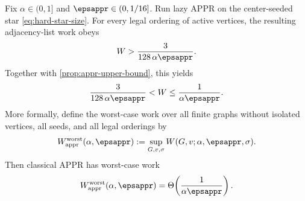 \begin{theorem}
\label{thm:appr-star-lower-bound}
Fix \(\alpha\in(0,1]\) and \(\epsappr\in(0,1/16]\). Run lazy APPR on the
center-seeded star \cref{eq:hard-star-size}. For every legal ordering of
active vertices, the resulting adjacency-list work obeys
\begin{equation}
    W>\frac{3}{128\,\alpha\epsappr}.
    \label{eq:appr-star-lower-bound}
\end{equation}
Together with \cref{prop:appr-upper-bound}, this yields
\begin{equation}
    \frac{3}{128\,\alpha\epsappr}
    <W
    \leq\frac{1}{\alpha\epsappr}.
    \label{eq:appr-star-two-sided-bound}
\end{equation}
More formally, define the worst-case work over all finite graphs without
isolated vertices, all seeds, and all legal orderings by
\begin{equation}
    W_{\mathrm{appr}}^{\mathrm{worst}}(\alpha,\epsappr)
    :=\sup_{G,v,\sigma}W(G,v;\alpha,\epsappr,\sigma).
    \label{eq:appr-worst-work-definition}
\end{equation}
Then classical APPR has worst-case work
\begin{equation}
    W_{\mathrm{appr}}^{\mathrm{worst}}(\alpha,\epsappr)
    =\Theta\!\left(\frac{1}{\alpha\epsappr}\right).
    \label{eq:appr-tight-complexity}
\end{equation}
\end{theorem}

